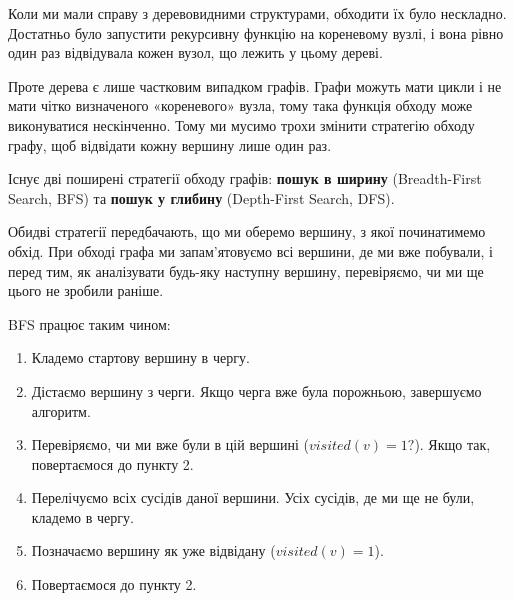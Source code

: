 \documentclass[12pt,a4paper]{report}
\begin{document}
Коли ми мали справу з деревовидними структурами, обходити їх було нескладно. Достатньо було запустити рекурсивну функцію на кореневому вузлі, і вона рівно один раз відвідувала кожен вузол, що лежить у цьому дереві.

Проте дерева є лише частковим випадком графів. Графи можуть мати цикли і не мати чітко визначеного «кореневого» вузла, тому така функція обходу може виконуватися нескінченно. Тому ми мусимо трохи змінити стратегію обходу графу, щоб відвідати кожну вершину лише один раз.

Існує дві поширені стратегії обходу графів: \textbf{пошук в ширину} (Breadth-First Search, BFS) та \textbf{пошук у глибину} (Depth-First Search, DFS).

Обидві стратегії передбачають, що ми оберемо вершину, з якої починатимемо обхід. При обході графа ми запам’ятовуємо всі вершини, де ми вже побували, і перед тим, як аналізувати будь-яку наступну вершину, перевіряємо, чи ми ще цього не зробили раніше.

BFS працює таким чином:

\begin{enumerate}
    \item Кладемо стартову вершину в чергу.
    \item Дістаємо вершину з черги. Якщо черга вже була порожньою, завершуємо алгоритм.
    \item Перевіряємо, чи ми вже були в цій вершині (\(visited(v) = 1?\)). Якщо так, повертаємося до пункту 2.
    \item Перелічуємо всіх сусідів даної вершини. Усіх сусідів, де ми ще не були, кладемо в чергу.
    \item Позначаємо вершину як уже відвідану (\(visited(v) = 1\)).
    \item Повертаємося до пункту 2.
\end{enumerate}
\end{document}
